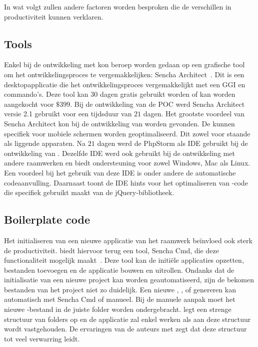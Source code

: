 In wat volgt zullen andere factoren worden besproken die de verschillen in productiviteit kunnen verklaren.

\subsection{Tools}
Enkel bij de ontwikkeling met \st{} kon beroep worden gedaan op een grafische tool om het ontwikkelingsproces te vergemakkelijken:  Sencha Architect~\cite{Sencha2012a}.
Dit is een desktopapplicatie die het ontwikkelingsproces vergemakkelijkt met een GGI en  commando's.  
Deze tool kan 30 dagen gratis gebruikt worden of kan worden aangekocht voor $\$399$.
Bij de ontwikkeling van de POC werd Sencha Architect versie 2.1 gebruikt voor een tijdsduur van $21$ dagen.
Het grootste voordeel van Sencha Architect kon bij de ontwikkeling van  worden gevonden.
De  kunnen specifiek voor mobiele schermen worden geoptimaliseerd.
Dit zowel voor staande als liggende apparaten.
Na $21$ dagen werd de PhpStorm als IDE gebruikt bij de ontwikkeling van \st{}.
Dezelfde IDE werd ook gebruikt bij de ontwikkeling met andere raamwerken en biedt ondersteuning voor zowel Windows, Mac als Linux.
Een voordeel bij het gebruik van deze IDE is onder andere de automatische codeaanvulling.
Daarnaast toont de IDE hints voor het optimaliseren van \js{}-code die specifiek gebruikt maakt van de jQuery-bibliotheek.

\subsection{Boilerplate code}
Het initialiseren van een nieuwe applicatie van het raamwerk beïnvloed ook sterk de productiviteit.
\st{} biedt hiervoor terug een tool,  Sencha Cmd,  die deze functionaliteit mogelijk maakt~\cite{Sencha2012}.
Deze tool kan de initiële applicaties opzetten,  bestanden toevoegen en de applicatie bouwen en uitrollen.
Ondanks dat de initialisatie van een nieuwe project kan worden geautomatiseerd, zijn de bekomen bestanden van het project niet zo duidelijk.
Een nieuwe ,  ,   of  genereren kan automatisch met Sencha Cmd of manueel.
Bij de manuele aanpak moet het nieuwe \js-bestand in de juiste folder worden ondergebracht.
\st{} legt een strenge structuur van folders op en de applicatie zal enkel werken als aan deze structuur wordt vastgehouden.
De ervaringen van de auteurs met \st{} zegt dat deze structuur tot veel verwarring leidt.

